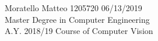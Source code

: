 \documentclass[11pt]{article}
\begin{document}
\begin{titlepage}
	
\begin{normalsize}
\begin{flushleft}
  \hspace{0pt} Moratello Matteo 1205720 \hspace{281pt} 06/13/2019\\

  \hspace{0pt} Master Degree in Computer Engineering\\
 
  \hspace{0pt} A.Y. 2018/19 Course of Computer Vision\\
[6mm]
\end{flushleft}
\end{normalsize}

	\begin{center}


\end{center}
\end{titlepage}
\end{document}

